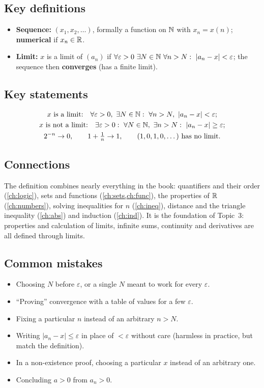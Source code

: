 \subsection*{Key definitions}
\begin{itemize}
  \item \textbf{Sequence:} $(x_1,x_2,\dots)$, formally a function on $\mathbb{N}$ with $x_n=x(n)$; \textbf{numerical} if $x_n\in\mathbb{R}$.
  \item \textbf{Limit:} $x$ is a limit of $(a_n)$ if $\forall\varepsilon>0\ \exists N\in\N\ \forall n>N:\ |a_n-x|<\varepsilon$; the
  sequence then \textbf{converges} (has a finite limit).
\end{itemize}

\subsection*{Key statements}
\begin{gather*}
\text{$x$ is a limit:}\quad \forall\varepsilon>0,\ \exists N\in\N:\ \forall n>N,\ |a_n-x|<\varepsilon;\\
\text{$x$ is not a limit:}\quad \exists\varepsilon>0:\ \forall N\in\N,\ \exists n>N:\ |a_n-x|\ge\varepsilon;\\
2^{-n}\to0,\qquad 1+\tfrac1n\to1,\qquad (1,0,1,0,\dots)\ \text{has no limit.}
\end{gather*}

\subsection*{Connections}
The definition combines nearly everything in the book: quantifiers and their order (\cref{ch:logic}), sets and functions
(\cref{ch:sets,ch:func}), the properties of $\mathbb{R}$ (\cref{ch:numbers}), solving inequalities for $n$ (\cref{ch:ineq}), distance and the
triangle inequality (\cref{ch:abs}) and induction (\cref{ch:ind}). It is the foundation of Topic~3: properties and calculation of
limits, infinite sums, continuity and derivatives are all defined through limits.

\subsection*{Common mistakes}
\begin{itemize}
  \item Choosing $N$ before $\varepsilon$, or a single $N$ meant to work for every $\varepsilon$.
  \item ``Proving'' convergence with a table of values for a few $\varepsilon$.
  \item Fixing a particular $n$ instead of an arbitrary $n>N$.
  \item Writing $|a_n-x|\le\varepsilon$ in place of $<\varepsilon$ without care (harmless in practice, but match the definition).
  \item In a non-existence proof, choosing a particular $x$ instead of an arbitrary one.
  \item Concluding $a>0$ from $a_n>0$.
\end{itemize}

